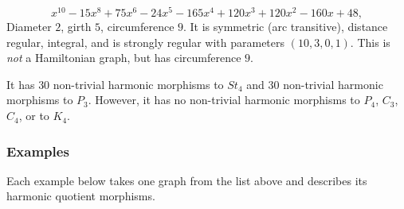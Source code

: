 \documentclass[12pt,letterpaper]{article}
\theoremstyle{definition}
\begin{document}
\begin{enumerate}
\[
x^{10} - 15x^8 + 75x^6 - 24x^5 - 165x^4 + 120x^3 + 120x^2 - 160x +48,
\]
Diameter $2$,
girth $5$,
circumference $9$.
It is symmetric (arc transitive),
distance regular, integral, and is strongly regular with
parameters $(10,3,0,1)$.
This is {\it not} a Hamiltonian graph, but has circumference $9$.

It has $30$ non-trivial harmonic morphisms to $St_4$ and
$30$ non-trivial harmonic morphisms to $P_3$.
However, it has
no non-trivial harmonic morphisms to $P_4$, $C_3$, $C_4$, or to $K_4$.

\end{enumerate}  



\subsubsection{Examples}
\label{sec:d3reg10-examples}

Each example below takes one graph from the list above and describes
its harmonic quotient morphisms.
\end{document}
